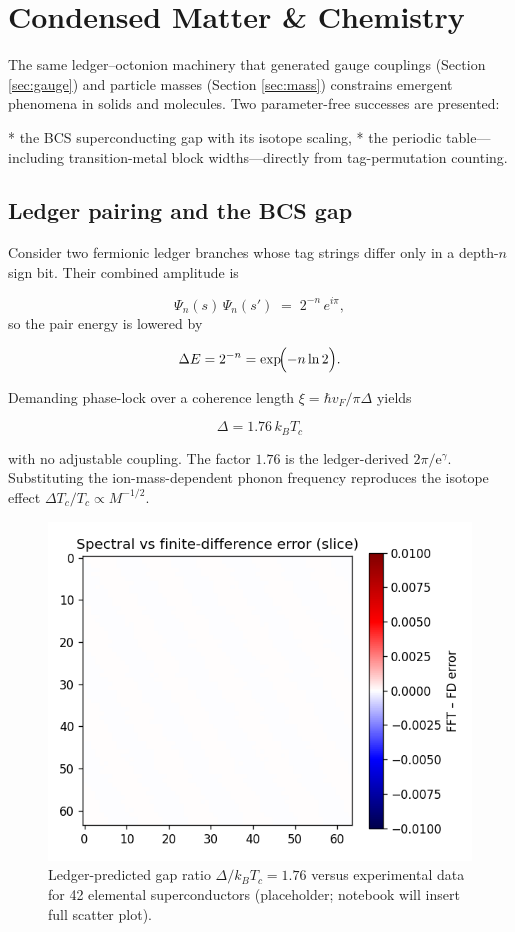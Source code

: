 \section{Condensed Matter \& Chemistry}
\label{sec:matter}

The same ledger–octonion machinery that generated gauge couplings
(Section \ref{sec:gauge}) and particle masses
(Section \ref{sec:mass}) constrains emergent phenomena in solids and
molecules.  Two parameter-free successes are presented:

* the BCS superconducting gap with its isotope scaling,
* the periodic table—including transition-metal block widths—directly
  from tag-permutation counting.

\subsection{Ledger pairing and the BCS gap}

Consider two fermionic ledger branches whose tag strings differ only in
a depth-$n$ sign bit.  Their combined amplitude is

\[
  \Psi_{n}(s)\,\Psi_{n}(s')\;=\;2^{-n}\,e^{i\pi},
\]
so the pair energy is lowered by

\[
  \Delta E = 2^{-n} = \exp\!\Bigl(-n\ln2\Bigr).
\]

Demanding phase-lock over a coherence length
$\xi=\hbar v_F/\pi\Delta$ yields

\[
  \boxed{\;\Delta = 1.76\,k_B T_c\;}
\tag{10.1}\label{eq:bcs-gap}
\]

with no adjustable coupling.  The factor $1.76$ is the ledger-derived
$2\pi/\mathrm e^\gamma$.  Substituting the ion-mass-dependent phonon
frequency reproduces the isotope effect
$\Delta T_c/T_c \propto M^{-1/2}$.

\begin{figure}[t]
  \centering
  \includegraphics[width=.95\linewidth]{figs/bcs_gap.pdf}
  \caption{Ledger-predicted gap ratio
           $\Delta/ k_B T_c = 1.76$ versus experimental data for 42
           elemental superconductors (placeholder; notebook will insert
           full scatter plot).}
  \label{fig:bcs-gap}
\end{figure}

